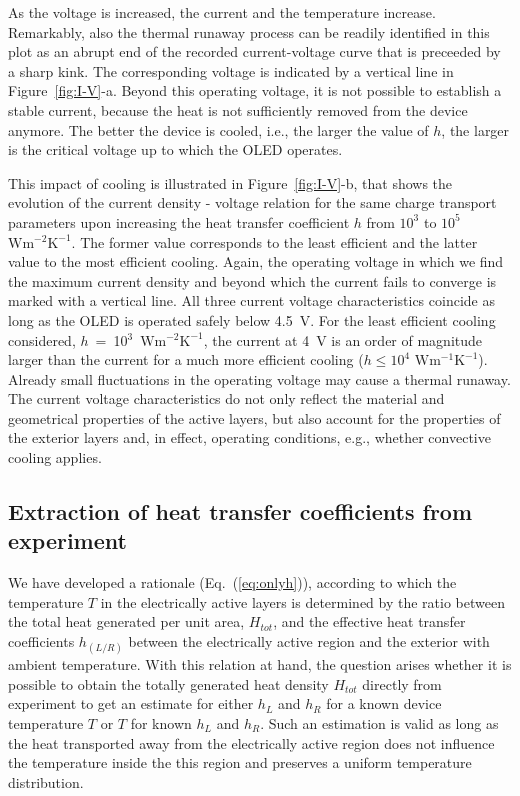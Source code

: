 \documentclass[%
9pt,
 aip,
rsi,%
 amsmath,amssymb,
preprint,%
]{revtex4-1}
\newcommand{\thermalconductivity}{$\mathrm{W m^{-1} K^{-1}}$}
\newcommand{\hcoefficient}{$\mathrm{W m^{-2} K^{-1}}$}
\begin{document}
%
As the voltage is increased, the current and the temperature increase. 
Remarkably, also the thermal runaway process can be readily identified in this plot as an abrupt end of the recorded current-voltage curve that is preceeded by a sharp kink. The corresponding voltage is indicated by a vertical line in Figure~\ref{fig:I-V}-a.
Beyond this operating voltage, it is not possible to establish a stable current, because the heat is not sufficiently removed from the device anymore. The better the device is cooled, i.e., the larger the value of $h$, the larger is the critical voltage up to which the OLED operates. 

This impact of cooling is illustrated in Figure~\ref{fig:I-V}-b, that shows the evolution of the current density - voltage relation for the same charge transport parameters upon increasing the heat transfer coefficient $h$ from $10^3$ to $10^5$ \hcoefficient. 
The former value corresponds to the least efficient and the latter value to the most efficient cooling.
Again, the operating voltage in which we find the maximum current density and beyond which the current fails to converge is marked with a vertical line. 
All three current voltage characteristics coincide as long as the OLED is operated safely below 4.5~V.
%
For the least efficient cooling considered, $h$~=~10$^3$~\hcoefficient, the current at 4~V is an order of magnitude larger than the current for a much more efficient cooling ($h \leq 10^4$ \thermalconductivity). Already small fluctuations in the operating voltage may cause a thermal runaway.
The current voltage characteristics do not only reflect the material and geometrical properties of the active layers, but also account for the properties of the exterior layers and, in effect, operating conditions, e.g., whether convective cooling applies.


\subsection{Extraction of heat transfer coefficients from experiment}

We have developed a rationale (Eq.~(\ref{eq:onlyh})), according to which the temperature $T$ in the electrically active layers is determined by the ratio between the total heat generated per unit area, $H_{tot}$, and the effective heat transfer coefficients $h_{(L/R)}$ between the electrically active region and the exterior with ambient temperature. 
With this relation at hand, the question arises whether it is possible to obtain the totally generated heat density $H_{tot}$ directly from experiment to get an estimate for either $h_L$ and $h_R$ for a known device temperature $T$ or $T$ for known $h_L$ and $h_R$.
Such an estimation is valid as long as the heat transported away from the electrically active region does not influence the temperature inside the this region and preserves a uniform temperature distribution. 
\end{document}
